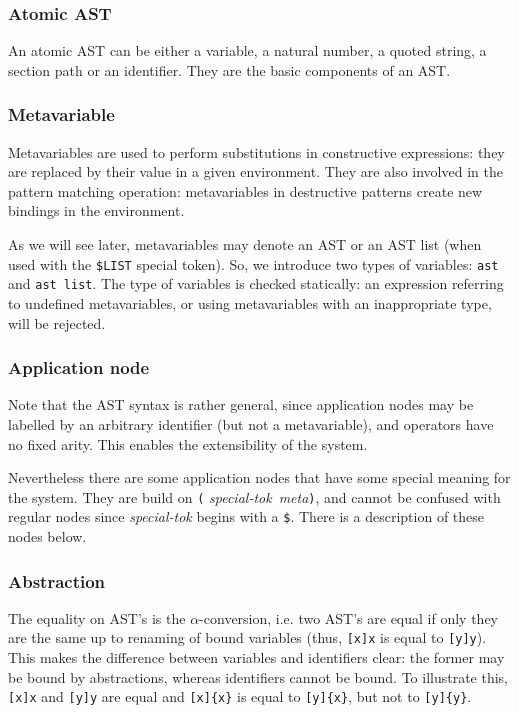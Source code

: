 \subsubsection{Atomic AST}

An atomic AST can be either a variable, a natural number, a quoted
string, a section path or an identifier. They are the basic components
of an AST.

\subsubsection{Metavariable}

Metavariables are used to perform substitutions in constructive
expressions: they are replaced by their value in a given
environment. They are also involved in the pattern matching operation:
metavariables in destructive patterns create new bindings in the
environment.

As we will see later, metavariables may denote an AST or an AST list
(when used with the \verb+$LIST+ special token).
So, we introduce two types of variables: \verb+ast+ and
\verb+ast list+. The type of variables is checked statically: an
expression referring to undefined metavariables, or using metavariables
with an inappropriate type, will be rejected.

\subsubsection{Application node}

Note that the AST syntax is rather general, since application nodes
may be labelled by an arbitrary identifier (but not a metavariable),
and operators have no fixed arity. This enables the extensibility of
the system.

Nevertheless there are some application nodes that have some special
meaning for the system. They are build on \verb+(+{\sl
special-tok}~{\sl meta}\verb+)+, and cannot be confused with regular
nodes since {\sl special-tok} begins with a \verb+$+.
There is a description of these nodes below.

\subsubsection{Abstraction}

The equality on AST's is the $\alpha$-conversion, i.e. two AST's are
equal if only they are the same up to renaming of bound variables
(thus, \verb+[x]x+ is equal to \verb+[y]y+). This makes the difference
between variables and identifiers clear: the former may be bound by
abstractions, whereas identifiers cannot be bound. To illustrate this,
\verb+[x]x+ and \verb+[y]y+ are equal and \verb+[x]{x}+ is equal to
\verb+[y]{x}+, but not to \verb+[y]{y}+.

